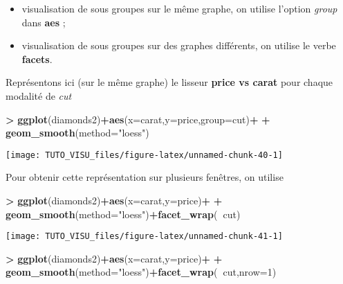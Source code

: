 \documentclass[]{article}
\newenvironment{Shaded}{\begin{snugshade}}{\end{snugshade}}
\newcommand{\DataTypeTok}[1]{\textcolor[rgb]{0.13,0.29,0.53}{#1}}
\newcommand{\DecValTok}[1]{\textcolor[rgb]{0.00,0.00,0.81}{#1}}
\newcommand{\KeywordTok}[1]{\textcolor[rgb]{0.13,0.29,0.53}{\textbf{#1}}}
\newcommand{\NormalTok}[1]{#1}
\newcommand{\OperatorTok}[1]{\textcolor[rgb]{0.81,0.36,0.00}{\textbf{#1}}}
\newcommand{\StringTok}[1]{\textcolor[rgb]{0.31,0.60,0.02}{#1}}
\providecommand{\tightlist}{%
  \setlength{\itemsep}{0pt}\setlength{\parskip}{0pt}}
\theoremstyle{definition}
\theoremstyle{definition}
\theoremstyle{definition}
\theoremstyle{remark}
\begin{document}
\begin{itemize}
\tightlist
\item
  visualisation de sous groupes sur le même graphe, on utilise l'option \emph{group} dans \textbf{aes} ;
\item
  visualisation de sous groupes sur des graphes différents, on utilise le verbe \textbf{facets}.
\end{itemize}

Représentons ici (sur le même graphe) le lisseur \textbf{price vs carat} pour chaque modalité de \emph{cut}

\begin{Shaded}
\begin{Highlighting}[]
\OperatorTok{>}\StringTok{ }\KeywordTok{ggplot}\NormalTok{(diamonds2)}\OperatorTok{+}\KeywordTok{aes}\NormalTok{(}\DataTypeTok{x=}\NormalTok{carat,}\DataTypeTok{y=}\NormalTok{price,}\DataTypeTok{group=}\NormalTok{cut)}\OperatorTok{+}
\OperatorTok{+}\StringTok{   }\KeywordTok{geom_smooth}\NormalTok{(}\DataTypeTok{method=}\StringTok{"loess"}\NormalTok{)}
\end{Highlighting}
\end{Shaded}

\begin{center}\texttt{[image: TUTO\_VISU\_files/figure-latex/unnamed-chunk-40-1]} \end{center}

Pour obtenir cette représentation sur plusieurs fenêtres, on utilise

\begin{Shaded}
\begin{Highlighting}[]
\OperatorTok{>}\StringTok{ }\KeywordTok{ggplot}\NormalTok{(diamonds2)}\OperatorTok{+}\KeywordTok{aes}\NormalTok{(}\DataTypeTok{x=}\NormalTok{carat,}\DataTypeTok{y=}\NormalTok{price)}\OperatorTok{+}
\OperatorTok{+}\StringTok{   }\KeywordTok{geom_smooth}\NormalTok{(}\DataTypeTok{method=}\StringTok{"loess"}\NormalTok{)}\OperatorTok{+}\KeywordTok{facet_wrap}\NormalTok{(}\OperatorTok{~}\NormalTok{cut)}
\end{Highlighting}
\end{Shaded}

\begin{center}\texttt{[image: TUTO\_VISU\_files/figure-latex/unnamed-chunk-41-1]} \end{center}

\begin{Shaded}
\begin{Highlighting}[]
\OperatorTok{>}\StringTok{ }\KeywordTok{ggplot}\NormalTok{(diamonds2)}\OperatorTok{+}\KeywordTok{aes}\NormalTok{(}\DataTypeTok{x=}\NormalTok{carat,}\DataTypeTok{y=}\NormalTok{price)}\OperatorTok{+}
\OperatorTok{+}\StringTok{   }\KeywordTok{geom_smooth}\NormalTok{(}\DataTypeTok{method=}\StringTok{"loess"}\NormalTok{)}\OperatorTok{+}\KeywordTok{facet_wrap}\NormalTok{(}\OperatorTok{~}\NormalTok{cut,}\DataTypeTok{nrow=}\DecValTok{1}\NormalTok{)}
\end{Highlighting}
\end{Shaded}
\end{document}
